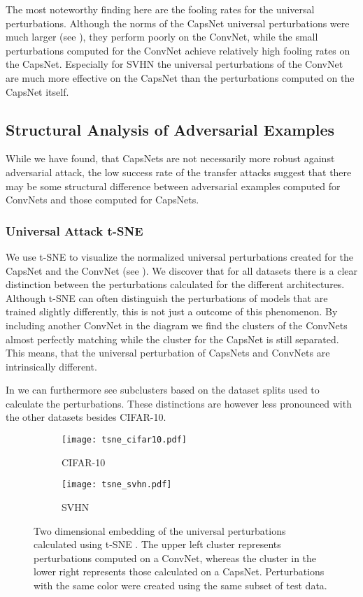 The most noteworthy finding here are the fooling rates for the universal perturbations.
Although the norms of the CapsNet universal perturbations were much larger (see ), they perform poorly on the ConvNet, while the small perturbations computed for the ConvNet achieve relatively high fooling rates on the CapsNet.
Especially for SVHN the universal perturbations of the ConvNet are much more effective on the CapsNet than the perturbations computed on the CapsNet itself.

\subsection{Structural Analysis of Adversarial Examples}

While we have found, that CapsNets are not necessarily more robust against adversarial attack, the low success rate of the transfer attacks suggest that there may be some structural difference between adversarial examples computed for ConvNets and those computed for CapsNets. 

\subsubsection{Universal Attack t-SNE}

We use t-SNE \citep{tsne} to visualize the normalized universal perturbations created for the CapsNet and the ConvNet (see ).
We discover that for all datasets there is a clear distinction between the perturbations calculated for the different architectures.
Although t-SNE can often distinguish the perturbations of models that are trained slightly differently, this is not just a outcome of this phenomenon.
By including another ConvNet in the diagram we find the clusters of the ConvNets almost perfectly matching while the cluster for the CapsNet is still separated.
This means, that the universal perturbation of CapsNets and ConvNets are intrinsically different.

In  we can furthermore see subclusters based on the dataset splits used to calculate the perturbations.
These distinctions are however less pronounced with the other datasets besides CIFAR-10.

\begin{figure}
	\centering
	\begin{subfigure}{.5\textwidth}
	\texttt{[image: tsne\_cifar10.pdf]}
	\caption{CIFAR-10}
	\end{subfigure}%
	\begin{subfigure}{.5\textwidth}
	\texttt{[image: tsne\_svhn.pdf]}
	\caption{SVHN}
	\end{subfigure}
	\caption[t-SNE Plot of Universal Perturbations]{Two dimensional embedding of the universal perturbations calculated using t-SNE \citep{tsne}. The upper left cluster represents perturbations computed on a ConvNet, whereas the cluster in the lower right represents those calculated on a CapsNet. Perturbations with the same color were created using the same subset of test data.}
	\label{fig:tsne}
\end{figure}



